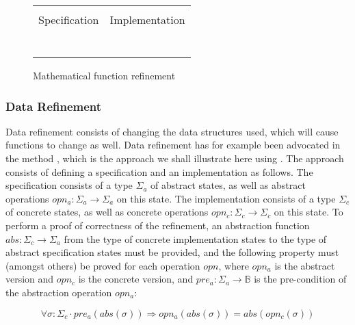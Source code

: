 \begin{figure}
  \centering
  \begin{tabular}[c]{c|c}
    \hline \\
    Specification & Implementation \\
    \hline\hline \\ \\
    \begin{subfigure}[c]{0.5\textwidth}
     
      \label{fig:prepost1}
    \end{subfigure}
    &
    \begin{subfigure}[c]{0.5\textwidth}
      
      \label{fig:prepost2}
    \end{subfigure}
    \\ \\
    \hline
  \end{tabular}    
  \caption{Mathematical function refinement}
  \label{fig:prepost}
\end{figure}

\subsubsection{Data Refinement}

Data refinement consists of changing the data structures used, which will
cause functions to change as well. Data refinement has for example been
advocated in the \vdm{} method \cite{vdm}, which is the approach we shall
illustrate here using \Klang. The approach consists of defining a specification 
and an implementation as follows. The specification consists of a type
$\Sigma_a$ of abstract states, as well as abstract operations $opn_a : \Sigma_a 
\rightarrow \Sigma_a$ on this state. The implementation consists of a type
$\Sigma_c$ of concrete states, as well as concrete operations $opn_c : \Sigma_c 
\rightarrow \Sigma_c$ on this state. To perform a proof of correctness of the 
refinement, an abstraction function $abs : \Sigma_c \rightarrow \Sigma_a$ from 
the type of concrete implementation states to the type of abstract specification 
states must be provided, and the following property must (amongst others) 
be proved for each operation $opn$, where $opn_a$ is the abstract version and $opn_c$ is the concrete version, and $pre_a : \Sigma_a \rightarrow \mathbb{B}$
is the pre-condition of the abstraction operation $opn_a$:

\begin{equation} \label{eq:refinement}
\forall \sigma : \Sigma_c \cdot 
  pre_a(abs(\sigma)) \Rightarrow opn_a(abs(\sigma)) = abs(opn_c(\sigma))
\end{equation}

